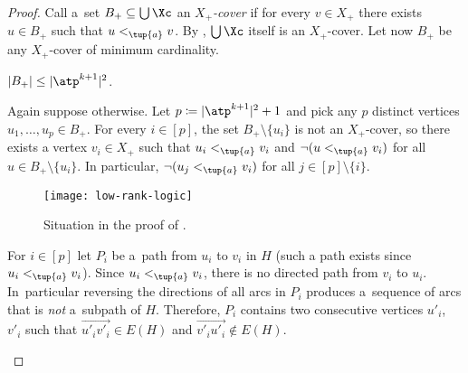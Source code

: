 \begin{proof}
    Call a~set $B_+ \subseteq \bigcup \Xc$ an \emph{$X_+$-cover} if for every $v \in X_+$ there exists $u \in B_+$ such that $u <_{\tup{a}} v$.
    By , $\bigcup \Xc$ itself is an $X_+$-cover.
    Let now $B_+$ be any $X_+$-cover of minimum cardinality.

    \begin{claim}
        \label{cl:small-upper-covering}
        $|B_+| \leq |\atp^{k+1}|^2$.
    \end{claim}
    \begin{claimproof}
        Again suppose otherwise.
        Let $p \coloneqq |\atp^{k+1}|^2 + 1$ and pick any $p$ distinct vertices $u_1, \ldots, u_p \in B_+$.
        For every $i \in [p]$, the set $B_+ \setminus \{u_i\}$ is not an $X_+$-cover, so there exists a vertex $v_i \in X_+$ such that $u_i <_{\tup{a}} v_i$ and $\neg (u <_{\tup{a}} v_i)$ for all $u \in B_+ \setminus \{u_i\}$.
        In particular, $\neg (u_j <_{\tup{a}} v_i)$ for all $j \in [p] \setminus \{i\}$.


\begin{figure}
 \centering

		\texttt{[image: low-rank-logic]}
 \caption{Situation in the proof of .}\label{fig:matching}
\end{figure}

        For $i \in [p]$ let $P_i$ be a~path from $u_i$ to $v_i$ in $H$ (such a path exists since $u_i <_{\tup{a}} v_i$).
        Since $u_i <_{\tup{a}} v_i$, there is no directed path from $v_i$ to $u_i$. In~particular reversing the directions of all arcs in $P_i$ produces a~sequence of arcs that is \emph{not} a~subpath of $H$.
        Therefore, $P_i$ contains two consecutive vertices $u'_i$, $v'_i$ such that $\vec{u'_i v'_i} \in E(H)$ and $\vec{v'_i u'_i} \notin E(H)$.


\end{claimproof}
\end{proof}
